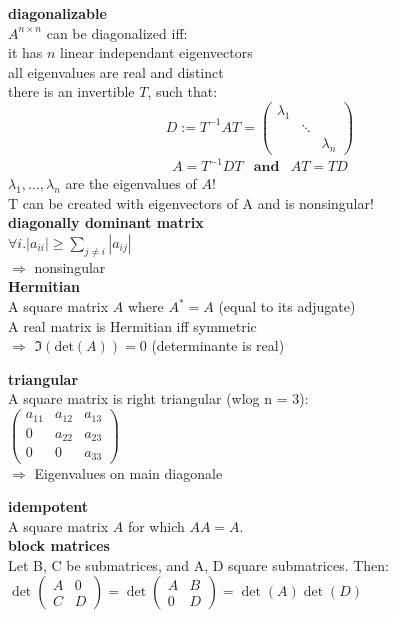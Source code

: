\documentclass[10pt,landscape]{scrartcl}
\newcommand{\sect}[1]{\vspace{1mm}\textbf{#1}\\}
\begin{document}
\begin{multicols}{3}
\sect{diagonalizable}
$A^{n \times n}$ can be diagonalized iff:\\
\quad it has $n$ linear independant eigenvectors\\
\quad all eigenvalues are real and distinct\\
\quad there is an invertible $T$, such that:
\[
D := T^{-1}AT=\begin{pmatrix}\lambda_{1}\\
& \ddots\\
& & \lambda_{n}\end{pmatrix}
\]
\[
\begin{array}{ccc}
A = T^{-1}DT & \mathbf{and} & AT=TD
\end{array}
\]
$\lambda_1,\dots,\lambda_n$ are the eigenvalues of $A$!\\
T can be created with eigenvectors of A and is nonsingular!\\

\sect{diagonally dominant matrix}
$\forall i. |a_{ii}| \geq \sum_{j\neq i} |a_{ij}| \quad$\\
$\Rightarrow$ nonsingular\\


\sect{Hermitian}
A square matrix $A$ where $A^* = A$ (equal to its adjugate)\\
A real matrix is Hermitian iff symmetric\\
$\Rightarrow$ $\Im(\text{det}(A)) = 0$ (determinante is real)


\sect{triangular}
A square matrix is right triangular (wlog n = 3):\\
$\begin{pmatrix} 
a_{11} & a_{12} & a_{13} \\
0 & a_{22} & a_{23} \\
0 & 0 & a_{33}
\end{pmatrix}$\\
$\Rightarrow$ Eigenvalues on main diagonale


\sect{idempotent}
A square matrix $A$ for which $AA = A$. \\


\sect{block matrices}
Let B, C be submatrices, and A, D square submatrices. Then:\\
$\det\begin{pmatrix}A& 0\\ C& D\end{pmatrix} = \det\begin{pmatrix}A& B\\ 0& D\end{pmatrix} = \det(A) \det(D)$


\end{multicols}
\end{document}
